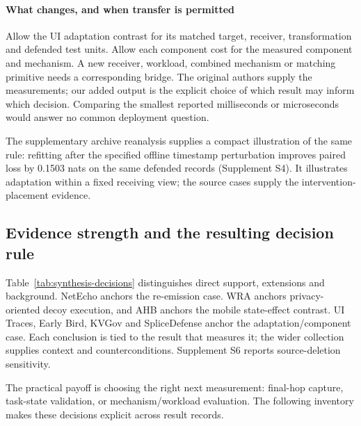 \paragraph{What changes, and when transfer is permitted}
Allow the UI adaptation contrast for its matched target, receiver, transformation and defended test units. Allow each component cost for the measured component and mechanism. A new receiver, workload, combined mechanism or matching primitive needs a corresponding bridge. The original authors supply the measurements; our added output is the explicit choice of which result may inform which decision. Comparing the smallest reported milliseconds or microseconds would answer no common deployment question.

The supplementary archive reanalysis supplies a compact illustration of the same rule: refitting after the specified offline timestamp perturbation improves paired loss by 0.1503 nats on the same defended records (Supplement S4). It illustrates adaptation within a fixed receiving view; the source cases supply the intervention-placement evidence.

\subsection{Evidence strength and the resulting decision rule}
Table~\ref{tab:synthesis-decisions} distinguishes direct support, extensions and background. NetEcho anchors the re-emission case. WRA anchors privacy-oriented decoy execution, and AHB anchors the mobile state-effect contrast. UI Traces, Early Bird, KVGov and SpliceDefense anchor the adaptation/component case. Each conclusion is tied to the result that measures it; the wider collection supplies context and counterconditions. Supplement S6 reports source-deletion sensitivity.


The practical payoff is choosing the right next measurement: final-hop capture, task-state validation, or mechanism/workload evaluation. The following inventory makes these decisions explicit across result records.
